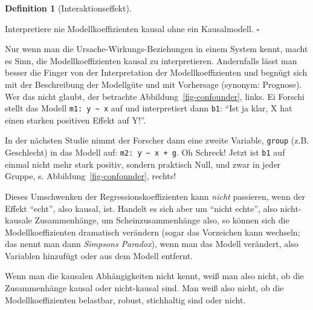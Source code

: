 \documentclass[
  letterpaper,
]{scrbook}
\theoremstyle{definition}
\theoremstyle{definition}
\theoremstyle{definition}
\newtheorem{definition}{Definition}[chapter]
\theoremstyle{remark}
\begin{document}
\begin{definition}[Interaktionseffekt]
\begin{tcolorbox}
Interpretiere nie Modellkoeffizienten kausal ohne ein Kausalmodell.
\(\square\)

\end{tcolorbox}

Nur wenn man die Ursache-Wirkungs-Beziehungen in einem System kennt,
macht es Sinn, die Modellkoeffizienten kausal zu interpretieren.
Andernfalls lässt man besser die Finger von der Interpretation der
Modellkoeffizienten und begnügt sich mit der Beschreibung der Modellgüte
und mit Vorhersage (synonym: Prognose). Wer das nicht glaubt, der
betrachte Abbildung~\ref{fig-confounder}, links. Ei Forschi stellt das
Modell \texttt{m1:\ y\ \textasciitilde{}\ x} auf und interpretiert dann
\texttt{b1}: \enquote{Ist ja klar, X hat einen starken positiven Effekt
auf Y!}.

In der nächsten Studie nimmt der Forscher dann eine zweite Variable,
\texttt{group} (z.B. Geschlecht) in das Modell auf:
\texttt{m2:\ y\ \textasciitilde{}\ x\ +\ g}. Oh Schreck! Jetzt ist
\texttt{b1} auf einmal nicht mehr stark positiv, sondern praktisch Null,
und zwar in jeder Gruppe, s. Abbildung~\ref{fig-confounder}, rechts!

Dieses Umschwenken der Regressionskoeffizienten kann \emph{nicht}
passieren, wenn der Effekt \enquote{echt}, also kausal, ist. Handelt es
sich aber um \enquote{nicht echte}, also nicht-kausale Zusammenhänge, um
Scheinzusammenhänge also, so können sich die Modellkoeffizienten
dramatisch verändern (sogar das Vorzeichen kann wechseln; das nennt man
dann \emph{Simpsons Paradox}), wenn man das Modell verändert, also
Variablen hinzufügt oder aus dem Modell entfernt.

Wenn man die kausalen Abhängigkeiten nicht kennt, weiß man also nicht,
ob die Zusammenhänge kausal oder nicht-kausal sind. Man weiß also nicht,
ob die Modellkoeffizienten belastbar, robust, stichhaltig sind oder
nicht.

\begin{figure}

\begin{minipage}{0.45\linewidth}

\centering{

}
\end{minipage}
\end{figure}
\end{definition}
\end{document}
